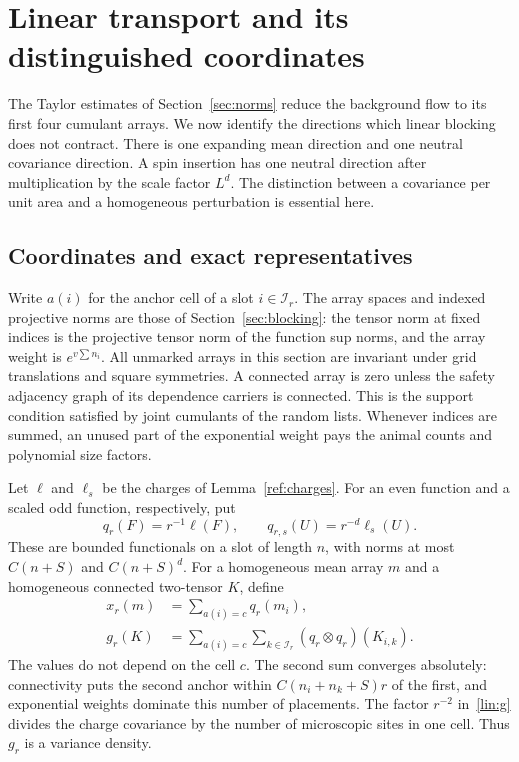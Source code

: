 \section{Linear transport and its distinguished coordinates}\label{sec:linear}
The Taylor estimates of Section~\ref{sec:norms} reduce the background flow to
its first four cumulant arrays.  We now identify the directions which linear
blocking does not contract.  There is one expanding mean direction and one
neutral covariance direction.  A spin insertion has one neutral direction
after multiplication by the scale factor $L^d$.  The distinction between a
covariance per unit area and a homogeneous perturbation is essential here.

\subsection{Coordinates and exact representatives}
Write $a(i)$ for the anchor cell of a slot $i\in \mathcal I_r$.  The array spaces and
indexed projective norms are those of Section~\ref{sec:blocking}: the tensor
norm at fixed indices is the projective tensor norm of the function sup norms,
and the array weight is $e^{v\sum n_i}$.  All unmarked arrays in this section
are invariant under grid translations and square symmetries.  A connected
array is zero unless the safety adjacency graph of its dependence carriers
is connected.  This is the support condition satisfied by joint cumulants of
the random lists.  Whenever indices are summed, an unused part of the
exponential weight pays the animal counts and polynomial size factors.

Let $\ell$ and $\ell_s$ be the charges of Lemma~\ref{ref:charges}.
For an even function and a scaled odd function, respectively, put
\[
 q_r(F)=r^{-1}\ell(F),\qquad q_{r,s}(U)=r^{-d}\ell_s(U).
\]
These are bounded functionals on a slot of length $n$, with norms at most
$C(n+S)$ and $C(n+S)^d$.  For a homogeneous mean array $m$ and a homogeneous
connected two-tensor $K$, define
\begin{align}
 x_r(m)&=\sum_{a(i)=c}q_r(m_i),\label{lin:x}\\
 g_r(K)&=\sum_{a(i)=c}\sum_{k\in \mathcal I_r}
                  (q_r\otimes q_r)(K_{i,k}).\label{lin:g}
\end{align}
The values do not depend on the cell $c$.  The second sum converges absolutely:
connectivity puts the second anchor within $C(n_i+n_k+S)r$ of the first,
and exponential weights dominate this number of placements.  The factor
$r^{-2}$ in~\eqref{lin:g} divides the charge covariance by the number of
microscopic sites in one cell.  Thus $g_r$ is a variance density.

